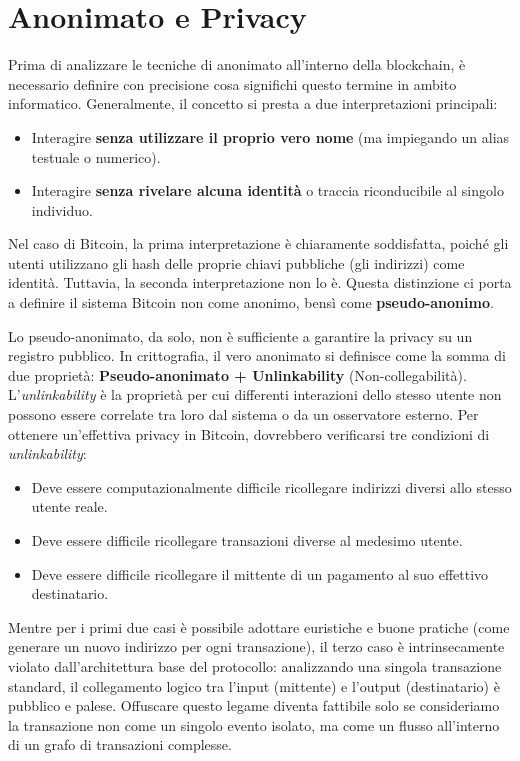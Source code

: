 \chapter{Anonimato e Privacy}

Prima di analizzare le tecniche di anonimato all'interno della blockchain, è necessario definire con precisione cosa significhi questo termine in ambito informatico. Generalmente, il concetto si presta a due interpretazioni principali:
\begin{itemize}
    \item Interagire \textbf{senza utilizzare il proprio vero nome} (ma impiegando un alias testuale o numerico).
    \item Interagire \textbf{senza rivelare alcuna identità} o traccia riconducibile al singolo individuo.
\end{itemize}

Nel caso di Bitcoin, la prima interpretazione è chiaramente soddisfatta, poiché gli utenti utilizzano gli hash delle proprie chiavi pubbliche (gli indirizzi) come identità. Tuttavia, la seconda interpretazione non lo è. Questa distinzione ci porta a definire il sistema Bitcoin non come anonimo, bensì come \textbf{pseudo-anonimo}. 

Lo pseudo-anonimato, da solo, non è sufficiente a garantire la privacy su un registro pubblico. In crittografia, il vero anonimato si definisce come la somma di due proprietà: \textbf{Pseudo-anonimato + Unlinkability} (Non-collegabilità). 
L'\textit{unlinkability} è la proprietà per cui differenti interazioni dello stesso utente non possono essere correlate tra loro dal sistema o da un osservatore esterno. Per ottenere un'effettiva privacy in Bitcoin, dovrebbero verificarsi tre condizioni di \textit{unlinkability}:
\begin{itemize}
    \item Deve essere computazionalmente difficile ricollegare indirizzi diversi allo stesso utente reale.
    \item Deve essere difficile ricollegare transazioni diverse al medesimo utente.
    \item Deve essere difficile ricollegare il mittente di un pagamento al suo effettivo destinatario.
\end{itemize}

Mentre per i primi due casi è possibile adottare euristiche e buone pratiche (come generare un nuovo indirizzo per ogni transazione), il terzo caso è intrinsecamente violato dall'architettura base del protocollo: analizzando una singola transazione standard, il collegamento logico tra l'input (mittente) e l'output (destinatario) è pubblico e palese. Offuscare questo legame diventa fattibile solo se consideriamo la transazione non come un singolo evento isolato, ma come un flusso all'interno di un grafo di transazioni complesse.

